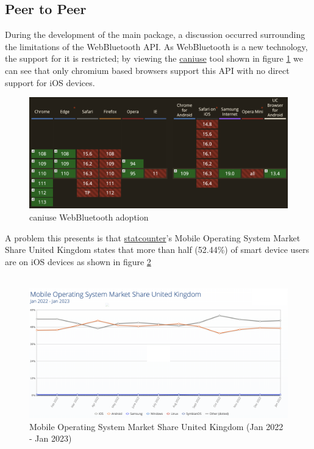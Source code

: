\documentclass{l4proj}
\begin{document}
\subsection{Peer to Peer}
\text During the development of the main package, a discussion occurred surrounding the limitations of the WebBluetooth API. As WebBluetooth is a new technology, the support for it is restricted; by viewing the \href{https://caniuse.com/?search=WebBluetooth}{caniuse} tool shown in figure \ref{fig:caniuse_webblue} we can see that only chromium based browsers support this API with no direct support for iOS devices.

\begin{figure}[!ht]
    \centering
    \includegraphics[width=12cm]{dissertation/images/caniuse_webbluetooth.png}
    \caption{caniuse WebBluetooth adoption}
    \label{fig:caniuse_webblue}
\end{figure}

A problem this presents is that \href{https://gs.statcounter.com/os-market-share/mobile/united-kingdom}{statcounter}'s Mobile Operating System Market Share United Kingdom states that more than half (52.44\%) of smart device users are on iOS devices as shown in figure \ref{fig:smartdeviceusage}\\\\

\begin{figure}[!ht]
    \centering
    \includegraphics[width=12cm]{dissertation/images/mobile-operating-system-usage.png}
    \caption{Mobile Operating System Market Share United Kingdom (Jan 2022 - Jan 2023)}
    \label{fig:smartdeviceusage}
\end{figure}
\end{document}
